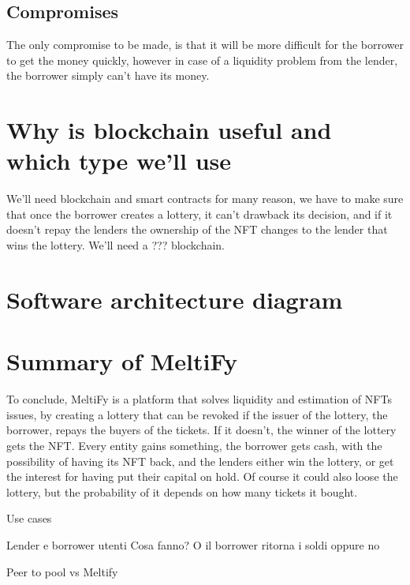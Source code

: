 \subsection{Compromises}
The only compromise to be made, is that it will be more difficult for the borrower to get the money quickly, however in case of a liquidity problem from the lender, the borrower simply can't have its money.  

\section{Why is blockchain useful and which type we'll use}
We'll need blockchain and smart contracts for many reason, we have to make sure that once the borrower creates a lottery, it can't drawback its decision, and if it doesn't repay the lenders the ownership of the NFT changes to the lender that wins the lottery. 
We'll need a ??? blockchain. %

\section{Software architecture diagram}

\section{Summary of MeltiFy}
To conclude, MeltiFy is a platform that solves liquidity and estimation of  NFTs issues, by creating a lottery that can be revoked if the issuer of the lottery, the borrower, repays the buyers of the tickets. If it doesn't, the winner of the lottery gets the NFT.
Every entity gains something, the borrower gets cash, with the possibility of having its NFT back, and the lenders either win the lottery, or get the interest for having put their capital on hold. Of course it could also loose the lottery, but the probability of it depends on how many tickets it bought.  



Use cases

Lender e borrower utenti 
Cosa fanno?
O il borrower ritorna i soldi oppure no 

Peer to pool vs Meltify